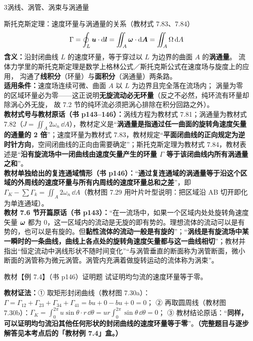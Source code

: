 \begin{kaodian}{3}{涡线、涡管、涡束与涡通量}
\begin{gongshi}{斯托克斯定理：速度环量与涡通量的关系（教材式 7.83、7.84）}
\[ \Gamma=\oint_L \bm{u}\cdot\mathrm{d}\bm{l}=\iint_A \bm{\omega}\cdot\mathrm{d}\bm{A}=\iint_A \Omega\,\mathrm{d} A \]
\textbf{含义：}沿封闭曲线 $L$ 的速度环量，等于穿过以 $L$ 为边界的曲面 $A$ 的\textbf{涡通量}。
流体力学里的斯托克斯定理是数学上格林公式／斯托克斯公式在速度场与旋度上的应用，
沟通了\textbf{线积分}（环量）与\textbf{面积分}（涡通量）两条路。\\
\textbf{适用条件：}速度场连续可微、曲面 $A$ 以 $L$ 为边界且完全落在流场内；
涡量为零的区域环量必为零——这正说明\textbf{无旋流动必无环量}（反之不必然，纯环流有环量却除涡心外无旋，
故 7.2 节的纯环流必须把涡心排除在积分回路之外）。\\
\textbf{教材式号与教材原话（书 p143--146）：}涡线方程为教材式 7.81；涡通量为教材式 7.82（$J=\displaystyle\iint_A 2\omega_n\,\dd A$），教材定义是“\textbf{涡通量是指通过任一曲面的旋转角速度矢量的通量的 2 倍}”；速度环量为教材式 7.83，教材规定“\textbf{平面闭曲线的正向规定为逆时针方向}，空间闭曲线的正向由需要确定”；斯托克斯定理为教材式 7.84，教材表述是“\textbf{沿有旋流场中一闭曲线由速度矢量产生的环量 $\Gamma$ 等于该闭曲线内所有涡通量之和}”。\\
\textbf{教材单独给出的复连通域情形（书 p146）：}“\textbf{通过复连通域的涡通量等于沿这个区域的外周线的速度环量与所有内周线的速度环量总和之差}”，即 $\Gamma_K-\sum\Gamma_k=\displaystyle\iint_A 2\omega_n\,\dd A$（教材图 7.29 用叶片叶型说明：把区域沿 AB 切开即化为单连通域）。\\
\textbf{教材 7.6 节开篇原话（书 p143）：}“在一流场中，如果一个区域内处处旋转角速度矢量 $\bm{\omega}$ 都为 0，这一区域内的流动是无旋的即有势的。理想流体的流动可以是有势的，也可以是有旋的。但\textbf{黏性流体的流动一般是有旋的}”；“\textbf{涡线是有旋流场中某一瞬时的一条曲线，曲线上各点处的旋转角速度矢量都与这一曲线相切}”；教材并指出“恒定流动中涡线形状不随时间变化”“与涡管垂直的断面称为涡管断面，微小断面的涡管称为微元涡管。涡管内充满着做旋转运动的流体称为涡束”。
\end{gongshi}

\begin{zhenti}{教材【例 7.4】（书 p146）}{证明题}
试证明均匀流的速度环量等于零。
\end{zhenti}
\noindent\textbf{教材证法：}① 取矩形封闭曲线（教材图 7.30a）：$\Gamma=\Gamma_{12}+\Gamma_{23}+\Gamma_{34}+\Gamma_{41}=bu+0-bu+0=0$；
② 再取圆周线（教材图 7.30b）：$\Gamma_K=\displaystyle\int_0^{2\pi}u\sin\theta\cdot r\,\dd\theta=ur\int_0^{2\pi}\sin\theta\,\dd\theta=0$；
③ 教材结论原话：“\textbf{同样，可以证明均匀流沿其他任何形状的封闭曲线的速度环量等于零}”。\textbf{（完整题目与逐步解答见本考点后的「教材例 7.4」盒。）}


\end{kaodian}
